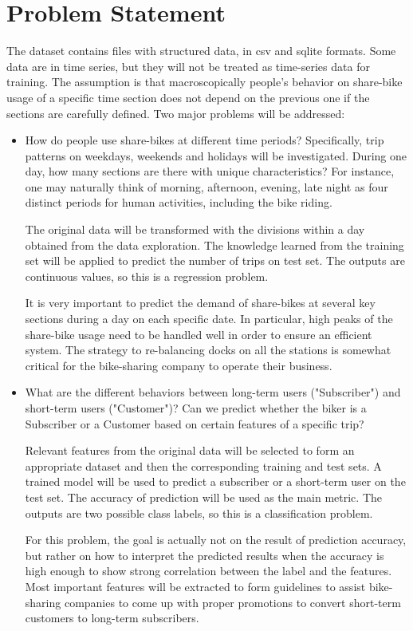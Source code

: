 \documentclass[a4paper]{article}
\begin{document}
		
	\section*{Problem Statement}
	
	The dataset contains files with structured data, in csv and sqlite formats. Some data are in time series, but they will not be treated as time-series data for training. The assumption is that macroscopically people's behavior on share-bike usage of a specific time section does not depend on the previous one if the sections are carefully defined. Two major problems will be addressed:
	
	\begin{itemize}
		\item How do people use share-bikes at different time periods? Specifically, trip patterns on weekdays, weekends and holidays will be investigated. During one day, how many sections are there with unique characteristics? For instance, one may naturally think of morning, afternoon, evening, late night as four distinct periods for human activities, including the bike riding.
		
		The original data will be transformed with the divisions within a day obtained from the data exploration. The knowledge learned from the training set will be applied to predict the number of trips on test set. The outputs are continuous values, so this is a regression problem. 
		
		It is very important to predict the demand of share-bikes at several key sections during a day on each specific date. In particular, high peaks of the share-bike usage need to be handled well in order to ensure an efficient system. The strategy to re-balancing docks on all the stations is somewhat critical for the bike-sharing company to operate their business.
		
		\item What are the different behaviors between long-term users ("Subscriber") and short-term users ("Customer")? Can we predict whether the biker is a Subscriber or a Customer based on certain features of a specific trip?
		
		Relevant features from the original data will be selected to form an appropriate dataset and then the corresponding training and test sets. A trained model will be used to predict a subscriber or a short-term user on the test set. The accuracy of prediction will be used as the main metric. The outputs are two possible class labels, so this is a classification problem. 
		
		For this problem, the goal is actually not on the result of prediction accuracy, but rather on how to interpret the predicted results when the accuracy is high enough to show strong correlation between the label and the features. Most important features will be extracted to form guidelines to assist bike-sharing companies to come up with proper promotions to convert short-term customers to long-term subscribers.
		
	\end{itemize}
	
\end{document}
